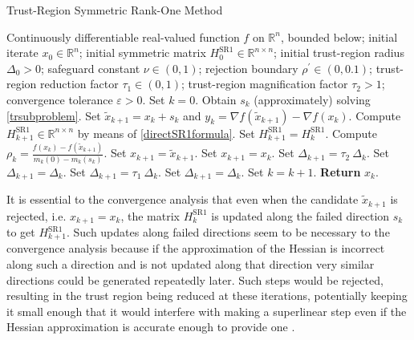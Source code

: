 \begin{algorithm}[H]
    \caption{Trust-Region Symmetric Rank-One Method}\label{TR-SR1Method}
    \begin{algorithmic}[1]
        \State Continuously differentiable real-valued function $f$ on $\mathbb{R}^n$, bounded below; initial iterate $x_0 \in \mathbb{R}^n$; initial symmetric matrix $H^{\mathrm{SR1}}_0 \in \mathbb{R}^{n \times n}$; initial trust-region radius $\Delta_0 > 0$; safeguard constant $\nu \in (0,1)$; rejection boundary $\rho^{\prime} \in (0, 0.1)$; trust-region reduction factor $\tau_1 \in (0,1)$; trust-region magnification factor $\tau_2 > 1$; convergence tolerance $\varepsilon > 0$. Set $k = 0$.
            \State Obtain $s_k$ (approximately) solving \cref{trsubproblem}.
            \State Set $\widetilde{x}_{k+1} = x_k + s_k$ and $y_k = \nabla f(\widetilde{x}_{k+1}) - \nabla f(x_k)$.
                \State Compute $H^{\mathrm{SR1}}_{k+1} \in \mathbb{R}^{n \times n}$ by means of \cref{directSR1formula}.
			\Else 
				\State Set $H^{\mathrm{SR1}}_{k+1} = H^{\mathrm{SR1}}_k$.
            \EndIf 
            \State Compute $\rho_k = \frac{f(x_k) - f(\widetilde{x}_{k+1})}{m_k(0) - m_k(s_k)}$.
                \State Set $x_{k+1} = \widetilde{x}_{k+1}$.
			\Else 
				\State Set $x_{k+1} = x_k$.
            \EndIf 
                    \State Set $\Delta_{k+1} = \tau_2 \ \Delta_k$.
                \Else 
                    \State Set $\Delta_{k+1} = \Delta_k$.
                \EndIf 
			\Else 
                    \State Set $\Delta_{k+1} = \tau_1 \ \Delta_k$.
                \Else 
                    \State Set $\Delta_{k+1} = \Delta_k$.
                \EndIf 
            \EndIf 
            \State Set $k = k+1$.
        \EndWhile
        \State \textbf{Return} $x_k$.
    \end{algorithmic}
\end{algorithm}

It is essential to the convergence analysis that even when the candidate $\widetilde{x}_{k+1}$ is rejected, i.e. $x_{k+1} = x_k$, the matrix $H^{\mathrm{SR1}}_k$ is updated along the failed direction $s_k$ to get $H^{\mathrm{SR1}}_{k+1}$. Such updates along failed directions seem to be necessary to the convergence analysis because if the approximation of the Hessian is incorrect along such a direction and is not updated along that direction very similar directions could be generated repeatedly later. Such steps would be rejected, resulting in the trust region being reduced at these iterations, potentially keeping it small enough that it would interfere with making a superlinear step even if the Hessian approximation is accurate enough to provide one \cite[p.~1028]{ByrdKhalfanSchnabel:1996}. 


